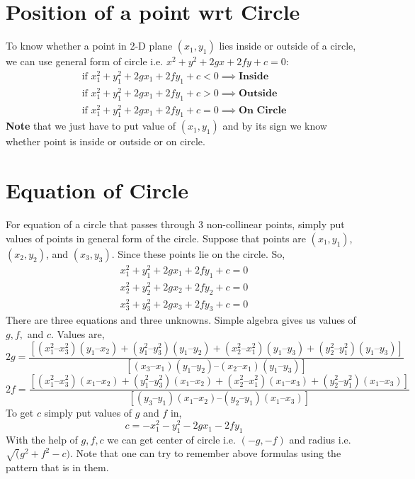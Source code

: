 \documentclass{article}
\begin{document}
\section{Position of a point wrt Circle}
To know whether a point in 2-D plane $(x_{1},y_{1})$ lies inside or outside of a circle, we can use general form of circle i.e. $x^2+y^2+2gx+2fy+c=0$:
\begin{align*}
    \text{if  } x_{1}^2+y_{1}^2+2gx_{1}+2fy_{1}+c<0 \implies \textbf{Inside}\\
    \text{if  } x_{1}^2+y_{1}^2+2gx_{1}+2fy_{1}+c>0 \implies \textbf{Outside}\\
    \text{if  } x_{1}^2+y_{1}^2+2gx_{1}+2fy_{1}+c=0 \implies \textbf{On Circle}
\end{align*}
\textbf{Note} that we just have to put value of $(x_{1},y_{1})$ and by its sign we know whether point is inside or outside or on circle.
\section{Equation of Circle}
For equation of a circle that passes through 3 non-collinear points, simply put values of points in general form of the circle. Suppose that points are $(x_{1},y_{1})$, $(x_{2},y_{2})$, and $(x_{3},y_{3})$. Since these points lie on the circle. So,
\begin{align*}
    x_{1}^2+y_{1}^2+2gx_{1}+2fy_{1}+c=0\\
    x_{2}^2+y_{2}^2+2gx_{2}+2fy_{2}+c=0\\
    x_{3}^2+y_{3}^2+2gx_{3}+2fy_{3}+c=0
\end{align*}
There are three equations and three unknowns. Simple algebra gives us values of $g,f,$ and $c$. Values are,
\begin{equation*}
    2g = \frac{[(x_1^2 – x_3^2)(y_1 – x_2) + (y_1^2 – y_3^2)(y_1 – y_2) + (x_2^2 – x_1^2)(y_1 – y_3) + (y_2^2 – y_1^2)(y_1 – y_3)]} { [(x_3 – x_1)(y_1 – y_2) – (x_2 – x_1)(y_1 – y_3)]}
\end{equation*}
\begin{equation*}
    2f = \frac{[(x_1^2 – x_3^2)(x_1 – x_2) + (y_1^2 – y_3^2 )(x_1 – x_2) + (x_2^2 – x_1^2)(x_1 – x_3) + (y_2^2 – y_1^2)(x_1 – x_3)] }{[(y_3 – y_1)(x_1 – x_2) – (y_2 – y_1)(x_1 – x_3)]}
\end{equation*}
To get $c$ simply put values of $g$ and $f$ in,
\begin{equation*}
    c=-x_1^2-y_1^2-2gx_1-2fy_1
\end{equation*}
With the help of $g,f,c$ we can get center of circle i.e. $(-g,-f)$ and radius i.e. $\sqrt(g^2+f^2-c)$. Note that one can try to remember above formulas using the pattern that is in them.
\end{document}
